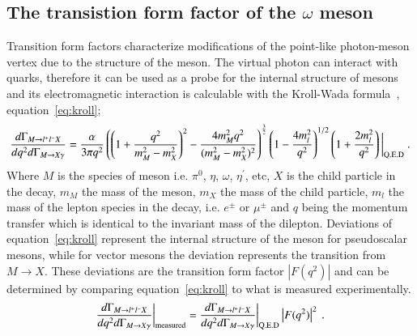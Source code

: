 \documentclass{aip-cp}
\begin{document}
\subsection{The transistion form factor  of the $\omega$ meson}
Transition form factors characterize modifications of the point-like photon-meson vertex due to the structure of the meson. The virtual photon can interact with quarks, therefore it can be used as a probe for the internal structure of mesons and its electromagnetic interaction is calculable with the Kroll-Wada formula~\cite{bib4}, equation~\ref{eq:kroll};
\begin{equation}
\frac{d\Gamma_{M{\rightarrow l^{+}l^{-}X}}}{dq^{2} d\Gamma_{M{\rightarrow X\gamma}}} = \frac{\alpha}{3\pi q^{2}}\left(\left(1+\frac{q^{2}}{m^{2}_{M}-m^{2}_{X}}\right)^2 - \frac{4m^{2}_{M}q^2}{(m^{2}_{M}-m^{2}_{X})^2}\right)^\frac{3}{2}\left(1-\frac{4m_{l}^{2}}{q^{2}}\right)^{1/2}\left(1+\frac{2m_{l}^{2}}{q^{2}}\right) \bigg|_{\mathrm{Q.E.D}}  \label{eq:kroll} \ . \\
\end{equation}
 Where $M$ is the species of meson i.e. $\pi^0$, $\eta$, $\omega$, $\eta^{\prime}$, etc, $X$ is the child particle in the decay, $m_M$ the mass of the meson, $m_X$ the mass of the child particle, $m_l$ the mass of the lepton species in the decay, i.e. $e^{\pm}$ or $\mu^{\pm}$ and $q$ being the momentum transfer which is identical to the invariant mass of the dilepton. Deviations of equation~\ref{eq:kroll} represent the internal structure of the meson for pseudoscalar mesons, while for vector mesons the deviation represents the transition from $M \to X$. These deviations are the transition form factor $\left| F(q^2)\right|$ and can be determined by comparing equation~\ref{eq:kroll} to what is measured experimentally.
 \begin{equation}
 \frac{d\Gamma_{M{\rightarrow l^{+}l^{-}X}}}{dq^{2} d\Gamma_{M{\rightarrow X\gamma}}}\bigg|_{\mathrm{measured}} =   \frac{d\Gamma_{M{\rightarrow l^{+}l^{-}X}}}{dq^{2} d\Gamma_{M{\rightarrow X\gamma}}} \bigg|_{\mathrm{Q.E.D}} \left| F(q^2)\right|^2 \label{eq:kroll_ff} \ . \\
 \end{equation}
\end{document}
